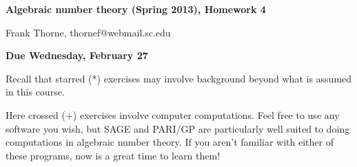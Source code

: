 \documentclass[12pt]{article}
\begin{document}
\setlength{\topmargin}{-2mm}





\begin{center}{\bf Algebraic number theory (Spring 2013), Homework 4}
\end{center}
\begin{center}Frank Thorne, thornef@webmail.sc.edu
\end{center}
\begin{center}
{\bf Due Wednesday, February 27}
\end{center}
Recall that starred (*) exercises may involve background beyond what is assumed in this course.

Here crossed (+) exercises involve computer computations. Feel free to use any software you wish,
but SAGE and PARI/GP are particularly well suited to doing computations in algebraic number theory.
If you aren't familiar with either of these programs, now is a great time to learn them!
\end{document}
